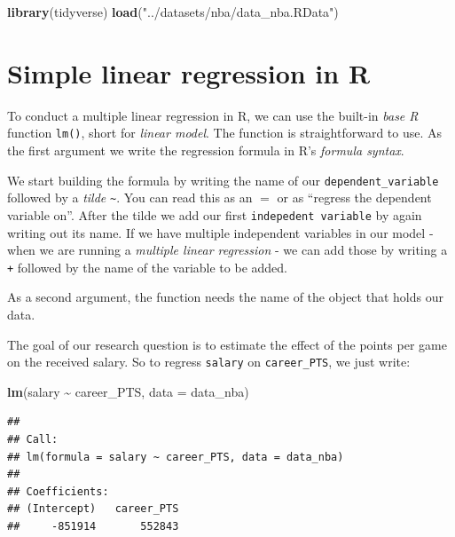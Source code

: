 \documentclass[
]{book}
\newenvironment{Shaded}{\begin{snugshade}}{\end{snugshade}}
\newcommand{\AttributeTok}[1]{\textcolor[rgb]{0.13,0.29,0.53}{#1}}
\newcommand{\FunctionTok}[1]{\textcolor[rgb]{0.13,0.29,0.53}{\textbf{#1}}}
\newcommand{\NormalTok}[1]{#1}
\newcommand{\SpecialCharTok}[1]{\textcolor[rgb]{0.81,0.36,0.00}{\textbf{#1}}}
\newcommand{\StringTok}[1]{\textcolor[rgb]{0.31,0.60,0.02}{#1}}
\begin{document}
\begin{Shaded}
\begin{Highlighting}[]
\FunctionTok{library}\NormalTok{(tidyverse)}
\FunctionTok{load}\NormalTok{(}\StringTok{"../datasets/nba/data\_nba.RData"}\NormalTok{)}
\end{Highlighting}
\end{Shaded}

\hypertarget{simple-linear-regression-in-r}{%
\section{Simple linear regression in R}\label{simple-linear-regression-in-r}}

To conduct a multiple linear regression in R, we can use the built-in \emph{base R}
function \texttt{lm()}, short for \emph{linear model}.
The function is straightforward to use. As the first argument
we write the regression formula in R's \emph{formula syntax}.

We start building the formula by writing the name of our \texttt{dependent\_variable}
followed by a \emph{tilde} \texttt{\textasciitilde{}}. You can read this as an \(=\) or as ``regress the
dependent variable on''. After the tilde we add our first \texttt{indepedent\ variable}
by again writing out its name. If we have multiple independent variables in our
model - when we are running a \emph{multiple linear regression} - we can add those by
writing a \texttt{+} followed by the name of the variable to be added.

As a second argument, the function needs the name of the object that holds our
data.

The goal of our research question is to estimate the effect of the points per
game on the received salary. So to regress \texttt{salary} on \texttt{career\_PTS}, we just
write:

\begin{Shaded}
\begin{Highlighting}[]
\FunctionTok{lm}\NormalTok{(salary }\SpecialCharTok{\textasciitilde{}}\NormalTok{ career\_PTS, }\AttributeTok{data =}\NormalTok{ data\_nba)}
\end{Highlighting}
\end{Shaded}

\begin{verbatim}
## 
## Call:
## lm(formula = salary ~ career_PTS, data = data_nba)
## 
## Coefficients:
## (Intercept)   career_PTS  
##     -851914       552843
\end{verbatim}
\end{document}
